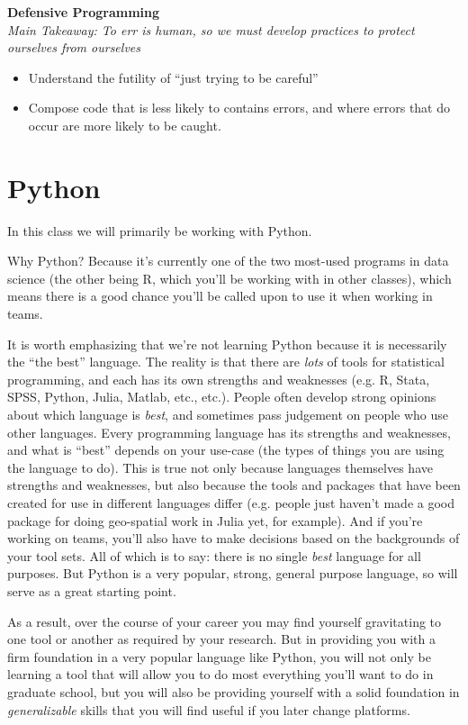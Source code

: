 \documentclass[12pt]{article}
\begin{document}
\textbf{Defensive Programming}\\
\emph{Main Takeaway: To err is human, so we must develop practices to protect ourselves from ourselves}
\begin{itemize}
	\item Understand the futility of ``just trying to be careful''
	\item Compose code that is less likely to contains errors, and where errors that do occur are more likely to be caught.
\end{itemize}

\section{Python}

In this class we will primarily be working with Python.

Why Python? Because it's currently one of the two most-used programs in data science (the other being R, which you'll be working with in other classes), which means there is a good chance you'll be called upon to use it when working in teams.

It is worth emphasizing that we're not learning Python because it is necessarily the ``the best'' language. The reality is that there are \emph{lots} of tools for statistical programming, and each has its own strengths and weaknesses (e.g. R, Stata, SPSS, Python, Julia, Matlab, etc., etc.). People often develop strong opinions about which language is \emph{best}, and sometimes pass judgement on people who use other languages. Every programming language has its strengths and weaknesses, and what is ``best'' depends on your use-case (the types of things you are using the language to do). This is true not only because languages themselves have strengths and weaknesses, but also because the tools and packages that have been created for use in different languages differ (e.g. people just haven't made a good package for doing geo-spatial work in Julia yet, for example). And if you're working on teams, you'll also have to make decisions based on the backgrounds of your tool sets. All of which is to say: there is no single \emph{best} language for all purposes. But Python is a very popular, strong, general purpose language, so will serve as a great starting point.

As a result, over the course of your career you may find yourself gravitating to one tool or another as required by your research. But in providing you with a firm foundation in a very popular language like Python, you will not only be learning a tool that will allow you to do most everything you'll want to do in graduate school, but you will also be providing yourself with a solid foundation in \emph{generalizable} skills that you will find useful if you later change platforms.
\end{document}
